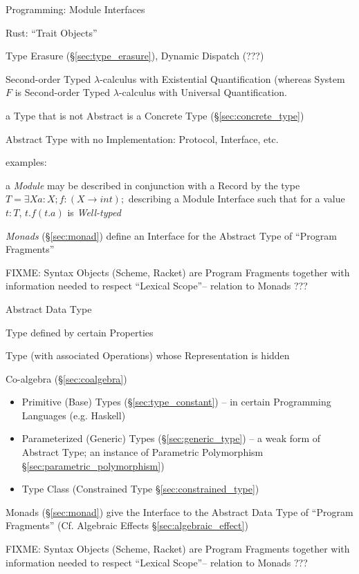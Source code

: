 Programming: Module Interfaces

Rust: ``Trait Objects''

Type Erasure (\S\ref{sec:type_erasure}), Dynamic Dispatch (???)

Second-order Typed $\lambda$-calculus with Existential Quantification
(whereas System $F$ is Second-order Typed $\lambda$-calculus with
Universal Quantification.

a Type that is not Abstract is a Concrete Type
(\S\ref{sec:concrete_type})

Abstract Type with no Implementation: Protocol, Interface, etc.

examples:

a \emph{Module} may be described in conjunction with a Record by the type $T =
\exists X { a : X; f : (X \rightarrow int); }$ describing a Module Interface
such that for a value $t : T$, $t.f (t.a)$ is \emph{Well-typed}

\emph{Monads} (\S\ref{sec:monad}) define an Interface for the Abstract
Type of ``Program Fragments''

FIXME: Syntax Objects (Scheme, Racket) are Program Fragments together
with information needed to respect ``Lexical Scope''-- relation to
Monads ???


\asterism


Abstract Data Type

Type defined by certain Properties %

Type (with associated Operations) whose Representation is hidden

Co-algebra (\S\ref{sec:coalgebra})

\begin{itemize}
  \item Primitive (Base) Types (\S\ref{sec:type_constant}) -- in
    certain Programming Languages (e.g. Haskell)
  \item Parameterized (Generic) Types (\S\ref{sec:generic_type}) -- a
    weak form of Abstract Type; an instance of Parametric Polymorphism
    \S\ref{sec:parametric_polymorphism})
  \item Type Class (Constrained Type \S\ref{sec:constrained_type})
\end{itemize}

Monads (\S\ref{sec:monad}) give the Interface to the Abstract Data
Type of ``Program Fragments'' (\fist Cf. Algebraic Effects
\S\ref{sec:algebraic_effect})

FIXME: Syntax Objects (Scheme, Racket) are Program Fragments together
with information needed to respect ``Lexical Scope''-- relation to
Monads ???



